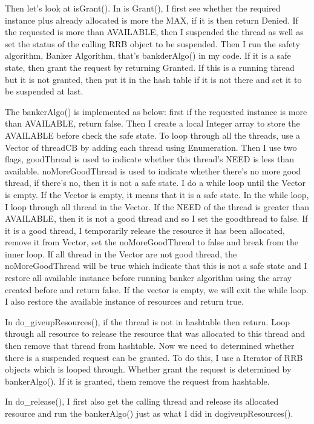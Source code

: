 \documentclass[11pt]{article}
\begin{document}
Then let's look at isGrant(). In is Grant(), I first see whether the required instance plus already allocated is more the MAX, if it is then return Denied. If the requested is more than AVAILABLE, then I suspended the thread as well as set the status of the calling RRB object to be suspended. Then I run the safety algorithm, Banker Algorithm, that's bankderAlgo() in my code. If it is a safe state, then grant the request by returning Granted. If this is a running thread but it is not granted, then put it in the hash table if it is not there and set it to be suspended at last.

The bankerAlgo() is implemented as below: first if the requested instance is more than AVAILABLE, return false. Then I create a local Integer array to store the AVAILABLE before check the safe state. To loop through all the threads, use a Vector of threadCB by adding each thread using Enumeration. Then I use two flags, goodThread is used to indicate whether this thread's NEED is less than available. noMoreGoodThread is used to indicate whether there's no more good thread, if there's no, then it is not a safe state. I do a while loop until the Vector is empty. If the Vector is empty, it means that it is a safe state. In the while loop, I loop through all thread in the Vector. If the NEED of the thread is greater than AVAILABLE, then it is not a good thread and so I set the goodthread to false. If it is a good thread, I temporarily release the resource it has been allocated, remove it from Vector, set the noMoreGoodThread to false and break from the inner loop. If all thread in the Vector are not good thread, the noMoreGoodThread will be true which indicate that this is not a safe state and I restore all available instance before running banker algorithm using the array created before and return false. If the vector is empty, we will exit the while loop. I also restore the available instance of resources and return true.

In do\_giveupResources(), if the thread is not in hashtable then return. Loop through all resource to release the resource that was allocated to this thread and then remove that thread from hashtable. Now we need to determined whether there is a suspended request can be granted. To do this, I use a Iterator of RRB objects which is looped through. Whether grant the request is determined by bankerAlgo(). If it is granted, them remove the request from hashtable.

In do\_release(), I first also get the calling thread and release its allocated resource and run the bankerAlgo() just as what I did in do\-giveupResources().
\end{document}
